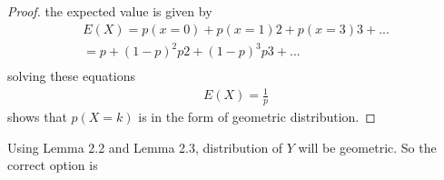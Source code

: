 \documentclass[journal,12pt,twocolumn]{IEEEtran}
\begin{document}
\begin{proof}
the expected value is given by
\begin{align}
E(X)= p(x=0)+p(x=1)2+p(x=3)3+...\\
=p+(1-p)^{2}p2+(1-p)^{3}p3+...\nonumber\\
\end{align}
solving these equations
\begin{align}
E(X)=\frac{1}{p}
\end{align}
shows that $p(X=k)$ is in the form of geometric distribution.
\end{proof}
Using Lemma 2.2 and Lemma 2.3, distribution of $Y$ will be geometric.
So the correct option is 
\end{document}
